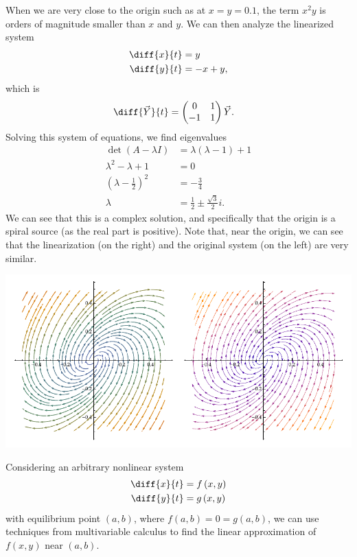 \documentclass[10pt]{mypackage}
\begin{document}
When we are very close to the origin such as at $x=y=0.1$, the term $x^2 y$ is orders of magnitude smaller than $x$ and $y$. We can then analyze the linearized system
\begin{align*}
  \diff{x}{t} &= y\\
  \diff{y}{t} &= -x + y,
\end{align*}
which is
\begin{align*}
  \diff{\vec{Y}}{t} &= \begin{pmatrix}0 & 1 \\ -1 & 1\end{pmatrix} \vec{Y}.
\end{align*}
Solving this system of equations, we find eigenvalues 
\begin{align*}
  \det\left(A - \lambda I\right) &= \lambda\left(\lambda - 1\right) + 1\\
  \lambda^2 - \lambda + 1 &= 0\\
  \left(\lambda - \frac{1}{2}\right)^2 &= -\frac{3}{4}\\
  \lambda &= \frac{1}{2} \pm \frac{\sqrt{3}}{2}i.
\end{align*}
We can see that this is a complex solution, and specifically that the origin is a spiral source (as the real part is positive). Note that, near the origin, we can see that the linearization (on the right) and the original system (on the left) are very similar.
\begin{center}
  \includegraphics[width=15cm]{images/van_der_pol_linearization.pdf}
\end{center}
Considering an arbitrary nonlinear system
\begin{align*}
  \diff{x}{t} &= f\left(x,y\right)\\
  \diff{y}{t} &= g\left(x,y\right)
\end{align*}
with equilibrium point $\left(a,b\right)$, where $f\left(a,b\right) = 0 = g\left(a,b\right)$, we can use techniques from multivariable calculus to find the linear approximation of $f\left(x,y\right)$ near $\left(a,b\right)$.
\end{document}
